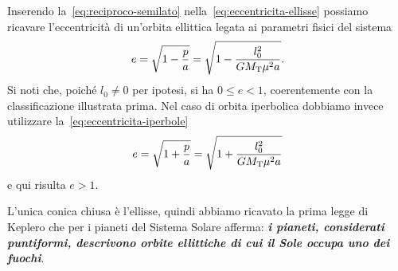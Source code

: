 Inserendo la~\eqref{eq:reciproco-semilato} nella~\eqref{eq:eccentricita-ellisse}
possiamo ricavare l'eccentricità di un'orbita ellittica legata ai parametri
fisici del sistema
\begin{equation}
  \label{eq:eccentricita-orbita-ellisse}
  e = \sqrt{1-\frac{p}{a}} = \sqrt{1-\frac{l_0^2}{GM_\textup{T}\mu^2a}}.
\end{equation}
Si noti che, poiché $l_0\neq 0$ per ipotesi, si ha $0\leq e<1$, coerentemente
con la classificazione illustrata prima. Nel caso di orbita iperbolica dobbiamo
invece utilizzare la~\eqref{eq:eccentricita-iperbole}
\begin{equation}
  \label{eq:eccentricita-orbita-iperbole}
  e = \sqrt{1+\frac{p}{a}} = \sqrt{1+\frac{l_0^2}{GM_\textup{T}\mu^2a}}
\end{equation}
e qui risulta $e>1$.

L'unica conica chiusa è l'ellisse, quindi abbiamo ricavato la prima legge di
Keplero che per i pianeti del Sistema Solare afferma: \textbf{\emph{i pianeti,
  considerati puntiformi, descrivono orbite ellittiche di cui il Sole occupa uno
  dei fuochi}}.

